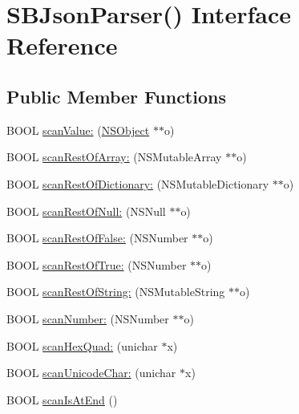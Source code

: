 \hypertarget{interface_s_b_json_parser_07_08}{
\section{\-S\-B\-Json\-Parser() \-Interface \-Reference}
\label{interface_s_b_json_parser_07_08}
}
\subsection*{\-Public \-Member \-Functions}
\begin{DoxyCompactItemize}
\item 
\-B\-O\-O\-L \hyperlink{interface_s_b_json_parser_07_08_ac636e0452108eb160cef77b66e912b0a}{scan\-Value\-:} (\hyperlink{class_n_s_object}{\-N\-S\-Object} $\ast$$\ast$o)
\item 
\-B\-O\-O\-L \hyperlink{interface_s_b_json_parser_07_08_a081c4ee408752efed7e907d9f9c2d4ca}{scan\-Rest\-Of\-Array\-:} (\-N\-S\-Mutable\-Array $\ast$$\ast$o)
\item 
\-B\-O\-O\-L \hyperlink{interface_s_b_json_parser_07_08_a3de09621653a0a1cd940f227d043bacb}{scan\-Rest\-Of\-Dictionary\-:} (\-N\-S\-Mutable\-Dictionary $\ast$$\ast$o)
\item 
\-B\-O\-O\-L \hyperlink{interface_s_b_json_parser_07_08_aeea34f47e63b11e406fa6a7b96108190}{scan\-Rest\-Of\-Null\-:} (\-N\-S\-Null $\ast$$\ast$o)
\item 
\-B\-O\-O\-L \hyperlink{interface_s_b_json_parser_07_08_a9b7107e91b570bcb02fb42d1003ead3b}{scan\-Rest\-Of\-False\-:} (\-N\-S\-Number $\ast$$\ast$o)
\item 
\-B\-O\-O\-L \hyperlink{interface_s_b_json_parser_07_08_a246c0a820e6fd69db1bbe79167c578c6}{scan\-Rest\-Of\-True\-:} (\-N\-S\-Number $\ast$$\ast$o)
\item 
\-B\-O\-O\-L \hyperlink{interface_s_b_json_parser_07_08_a0b251c81dc2753e3330709af36112429}{scan\-Rest\-Of\-String\-:} (\-N\-S\-Mutable\-String $\ast$$\ast$o)
\item 
\-B\-O\-O\-L \hyperlink{interface_s_b_json_parser_07_08_a40ea5a3426e2af523b6f4355fc41e0e7}{scan\-Number\-:} (\-N\-S\-Number $\ast$$\ast$o)
\item 
\-B\-O\-O\-L \hyperlink{interface_s_b_json_parser_07_08_a940e3c61c38e199844bf1a9fbc41138d}{scan\-Hex\-Quad\-:} (unichar $\ast$x)
\item 
\-B\-O\-O\-L \hyperlink{interface_s_b_json_parser_07_08_aea014e27d084f4d34e3025089c62aa74}{scan\-Unicode\-Char\-:} (unichar $\ast$x)
\item 
\-B\-O\-O\-L \hyperlink{interface_s_b_json_parser_07_08_a968fa7546f80d05c2d3d53fe57a2cece}{scan\-Is\-At\-End} ()
\end{DoxyCompactItemize}


